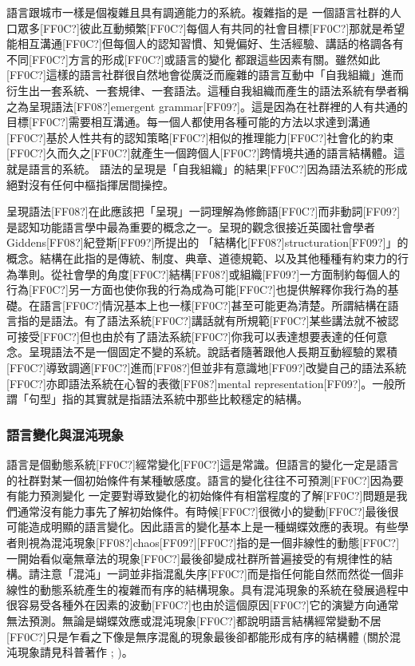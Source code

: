 語言跟城市一樣是個複雜且具有調適能力的系統。複雜指的是 一個語言社群的人口眾多[FF0C?]彼此互動頻繁[FF0C?]每個人有共同的社會目標[FF0C?]那就是希望能相互溝通[FF0C?]但每個人的認知習慣、知覺偏好、生活經驗、講話的格調各有不同[FF0C?]方言的形成[FF0C?]或語言的變化 都跟這些因素有關。雖然如此[FF0C?]這樣的語言社群很自然地會從廣泛而龐雜的語言互動中「自我組織」進而衍生出一套系統、一套規律、一套語法。這種自我組織而產生的語法系統有學者稱之為呈現語法[FF08?]emergent grammar[FF09?]。這是因為在社群裡的人有共通的目標[FF0C?]需要相互溝通。每一個人都使用各種可能的方法以求達到溝通[FF0C?]基於人性共有的認知策略[FF0C?]相似的推理能力[FF0C?]社會化的約束[FF0C?]久而久之[FF0C?]就產生一個跨個人[FF0C?]跨情境共通的語言結構體。這就是語言的系統。 語法的呈現是「自我組織」的結果[FF0C?]因為語法系統的形成絕對沒有任何中樞指揮居間操控。

呈現語法[FF08?]在此應該把「呈現」一詞理解為修飾語[FF0C?]而非動詞[FF09?]是認知功能語言學中最為重要的概念之一。呈現的觀念很接近英國社會學者 Giddens[FF08?]紀登斯[FF09?]所提出的 「結構化[FF08?]structuration[FF09?]」的概念。結構在此指的是傳統、制度、典章、道德規範、以及其他種種有約束力的行為準則。從社會學的角度[FF0C?]結構[FF08?]或組織[FF09?]一方面制約每個人的行為[FF0C?]另一方面也使你我的行為成為可能[FF0C?]也提供解釋你我行為的基礎。在語言[FF0C?]情況基本上也一樣[FF0C?]甚至可能更為清楚。所謂結構在語言指的是語法。有了語法系統[FF0C?]講話就有所規範[FF0C?]某些講法就不被認可接受[FF0C?]但也由於有了語法系統[FF0C?]你我可以表達想要表達的任何意念。呈現語法不是一個固定不變的系統。說話者隨著跟他人長期互動經驗的累積[FF0C?]導致調適[FF0C?]進而[FF08?]但並非有意識地[FF09?]改變自己的語法系統[FF0C?]亦即語法系統在心智的表徵[FF08?]mental representation[FF09?]。一般所謂「句型」指的其實就是指語法系統中那些比較穩定的結構。

\subsubsection{語言變化與混沌現象} %

語言是個動態系統[FF0C?]經常變化[FF0C?]這是常識。但語言的變化一定是語言的社群對某一個初始條件有某種敏感度。語言的變化往往不可預測[FF0C?]因為要有能力預測變化 一定要對導致變化的初始條件有相當程度的了解[FF0C?]問題是我們通常沒有能力事先了解初始條件。有時候[FF0C?]很微小的變動[FF0C?]最後很可能造成明顯的語言變化。因此語言的變化基本上是一種蝴蝶效應的表現。有些學者則視為混沌現象[FF08?]chaos[FF09?][FF0C?]指的是一個非線性的動態[FF0C?]一開始看似毫無章法的現象[FF0C?]最後卻變成社群所普遍接受的有規律性的結構。請注意「混沌」一詞並非指混亂失序[FF0C?]而是指任何能自然而然從一個非線性的動態系統產生的複雜而有序的結構現象。具有混沌現象的系統在發展過程中很容易受各種外在因素的波動[FF0C?]也由於這個原因[FF0C?]它的演變方向通常無法預測。無論是蝴蝶效應或混沌現象[FF0C?]都說明語言結構經常變動不居[FF0C?]只是乍看之下像是無序混亂的現象最後卻都能形成有序的結構體 (關於混沌現象請見科普著作\citealt{Gleick1988} ; \citealt{Waldrop1992})。


